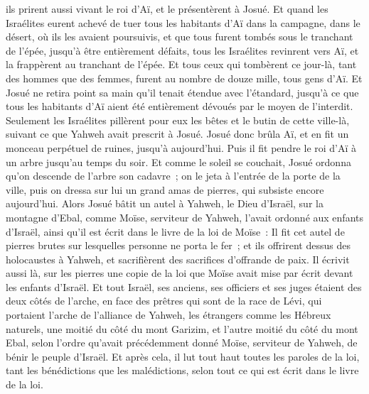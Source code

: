\begin{multicols}{2}
ils prirent aussi vivant le roi d'Aï, et le présentèrent à Josué.
Et quand les Israélites eurent achevé de tuer tous les habitants d'Aï dans la campagne, dans le désert, où ils les avaient poursuivis, et que tous furent tombés sous le tranchant de l'épée, jusqu'à être entièrement défaits, tous les Israélites revinrent vers Aï, et la frappèrent au tranchant de l'épée.
Et tous ceux qui tombèrent ce jour-là, tant des hommes que des femmes, furent au nombre de douze mille, tous gens d'Aï.
Et Josué ne retira point sa main qu'il tenait étendue avec l'étandard, jusqu'à ce que tous les habitants d'Aï aient été entièrement dévoués par le moyen de l'interdit.
Seulement les Israélites pillèrent pour eux les bêtes et le butin de cette ville-là, suivant ce que Yahweh avait prescrit à Josué.
Josué donc brûla Aï, et en fit un monceau perpétuel de ruines, jusqu'à aujourd'hui.
Puis il fit pendre le roi d'Aï à un arbre jusqu'au temps du soir. Et comme le soleil se couchait, Josué ordonna qu'on descende de l'arbre son cadavre~; on le jeta à l'entrée de la porte de la ville, puis on dressa sur lui un grand amas de pierres, qui subsiste encore aujourd'hui.
Alors Josué bâtit un autel à Yahweh, le Dieu d'Israël, sur la montagne d'Ebal,
comme Moïse, serviteur de Yahweh, l'avait ordonné aux enfants d'Israël, ainsi qu'il est écrit dans le livre de la loi de Moïse~: Il fit cet autel de pierres brutes sur lesquelles personne ne porta le fer~; et ils offrirent dessus des holocaustes à Yahweh, et sacrifièrent des sacrifices d'offrande de paix.
Il écrivit aussi là, sur les pierres une copie de la loi que Moïse avait mise par écrit devant les enfants d'Israël.
Et tout Israël, ses anciens, ses officiers et ses juges étaient des deux côtés de l'arche, en face des prêtres qui sont de la race de Lévi, qui portaient l'arche de l'alliance de Yahweh, les étrangers comme les Hébreux naturels, une moitié du côté du mont Garizim, et l'autre moitié du côté du mont Ebal, selon l'ordre qu'avait précédemment donné Moïse, serviteur de Yahweh, de bénir le peuple d'Israël.
Et après cela, il lut tout haut toutes les paroles de la loi, tant les bénédictions que les malédictions, selon tout ce qui est écrit dans le livre de la loi.

\end{multicols}
